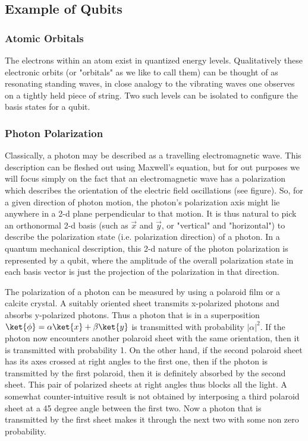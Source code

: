 \documentclass[12pt, oneside]{book}
\theoremstyle{definition}
\theoremstyle{definition}
\theoremstyle{remark}
\begin{document}
\subsection{Example of Qubits}
\subsubsection{Atomic Orbitals}
The electrons within an atom exist in quantized energy levels. Qualitatively these electronic orbits (or "orbitals" as we like to call them) can be thought of as resonating standing waves, in close analogy to the vibrating waves one observes on a tightly held piece of string. Two such levels can be isolated to configure the basis states for a qubit.

\subsubsection{Photon Polarization}
Classically, a photon may be described as a travelling electromagnetic wave. This description can be fleshed out using Maxwell's equation, but for out purposes we will focus simply on the fact that an electromagnetic wave has a polarization which describes the orientation of the electric field oscillations (see figure). So, for a given direction of photon motion, the photon's polarization axis might lie anywhere in a 2-d plane perpendicular to that motion. It is thus natural to pick an orthonormal 2-d basis (such as $\vec{x}$ and $\vec{y}$, or "vertical" and "horizontal") to describe the polarization state (i.e. polarization direction) of a photon. In a quantum mechanical description, this 2-d nature of the photon polarization is represented by a qubit, where the amplitude of the overall polarization state in each basis vector is just the projection of the polarization in that direction.

The polarization of a photon can be measured by using a polaroid film or a calcite crystal. A suitably oriented sheet transmits x-polarized photons and absorbs y-polarized photons. Thus a photon that is in a superposition $\ket{\phi}=\alpha\ket{x}+\beta \ket{y}$ is transmitted with probability $|\alpha|^2$. If the photon now encounters another polaroid sheet with the same orientation, then it is transmitted with probability 1. On the other hand, if the second polaroid sheet has its axes crossed at right angles to the first one, then if the photon is transmitted by the first polaroid, then it is definitely absorbed by the second sheet. This pair of polarized sheets at right angles thus blocks all the light. A somewhat counter-intuitive result is not obtained by interposing a third polaroid sheet at a 45 degree angle between the first two. Now a photon that is transmitted by the first sheet makes it through the next two with some non zero probability.
\end{document}
